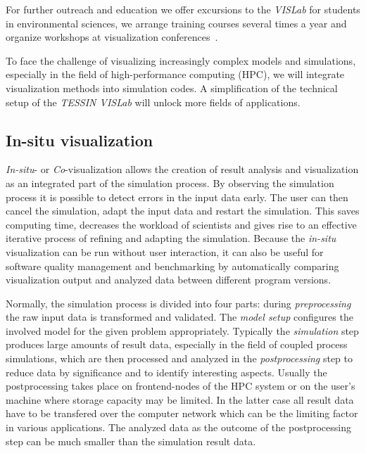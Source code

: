 \documentclass[twocolumn]{svjour3}          %
\begin{document}
For further outreach and education we offer excursions to the \emph{VISLab} for students in environmental sciences, we arrange training courses several times a year and organize workshops at visualization conferences~\cite{web:envirvis}.

To face the challenge of visualizing increasingly complex models and simulations, especially in the field of high-performance computing (HPC), we will integrate visualization methods into simulation codes. A simplification of the technical setup of the \emph{TESSIN VISLab} will unlock more fields of applications.

\subsection{In-situ visualization}
\label{in-situ-visualization}

\emph{In-situ}- or \emph{Co}-visualization allows the creation of result analysis and visualization as an integrated part of the simulation process. By observing the simulation process it is possible to detect errors in the input data early. The user can then cancel the simulation, adapt the input data and restart the simulation. This saves computing time, decreases the workload of scientists and gives rise to an effective iterative process of refining and adapting the simulation. Because the \emph{in-situ} visualization can be run without user interaction, it can also be useful for software quality management and benchmarking by automatically comparing visualization output and analyzed data between different program versions.

Normally, the simulation process is divided into four parts: during \emph{preprocessing} the raw input data is transformed and validated. The \emph{model setup} configures the involved model for the given problem appropriately. Typically the \emph{simulation} step produces large amounts of result data, especially in the field of coupled process simulations, which are then processed and analyzed in the \emph{postprocessing} step to reduce data by significance and to identify interesting aspects. Usually the postprocessing takes place on frontend-nodes of the HPC system or on the user's machine where storage capacity may be limited. In the latter case all result data have to be transfered over the computer network which can be the limiting factor in various applications. The analyzed data as the outcome of the postprocessing step can be much smaller than the simulation result data.
\end{document}
